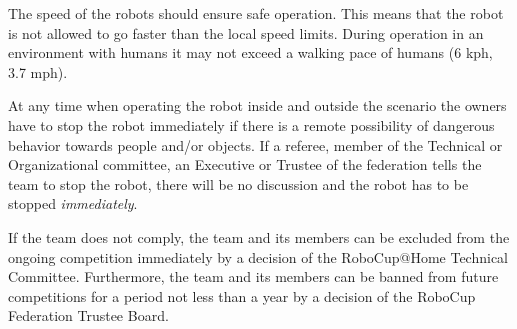 The speed of the robots should ensure safe operation. This means that the robot is not allowed to go faster than the local speed limits. During operation in an environment with humans it may not exceed a walking pace of humans (6 kph, 3.7 mph). 

At any time when operating the robot inside and outside the scenario the owners have to stop the robot immediately if there is a remote possibility of dangerous behavior towards people and/or objects. If a referee, member of the Technical or Organizational committee, an Executive or Trustee of the federation tells the team to stop the robot, there will be no discussion and the robot has to be stopped \emph{immediately}.

If the team does not comply, the team and its members can be excluded from the ongoing competition immediately by a decision of the RoboCup@Home Technical Committee. Furthermore, the team and its members can be banned from future competitions for a period not less than a year by a decision of the RoboCup Federation Trustee Board.

